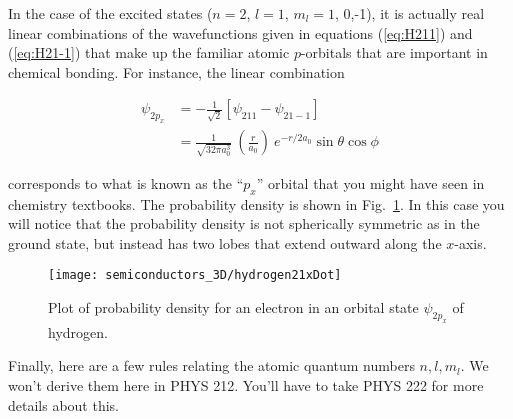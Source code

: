 In the case of the excited states ($n=2$, $l=1$, $m_l=1$, 0,-1), it is
actually real linear combinations of the wavefunctions given in
equations (\ref{eq:H211}) and (\ref{eq:H21-1}) that make up the
familiar atomic $p$-orbitals that are important in chemical
bonding. For instance, the linear combination

\begin{align}
  \psi_{2p_x} &= -\frac{1}{\sqrt{2}} \left[ \psi_{211} - \psi_{21-1} \right]\\
              &= \frac{1}{\sqrt{32 \pi a_0^3}}\ \left( \frac{r}{a_0} \right) \ e^{-r/2a_0} \sin{\theta} \cos{\phi}
  \nonumber
\end{align}

\noindent corresponds to what is known as the ``$p_x$'' orbital that
you might have seen in chemistry textbooks. The probability density is
shown in Fig.~\ref{fig:hydrogen21xDot}.  In this case you will notice
that the probability density is not spherically symmetric as in the
ground state, but instead has two lobes that extend outward along the
$x$-axis.

\begin{figure}
\begin{center}
\texttt{[image: semiconductors\_3D/hydrogen21xDot]}
\end{center}
\caption{Plot of probability density for an electron in an orbital state $\psi_{2p_x}$ of hydrogen.}
\label{fig:hydrogen21xDot}
\end{figure}

Finally, here are a few rules relating the atomic quantum numbers $n,
l, m_l$.  We won't derive them here in PHYS 212.  You'll have to take
PHYS 222 for more details about this.

